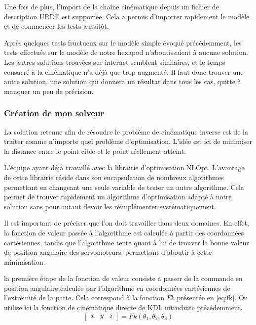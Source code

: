 \documentclass{tnreport}
\begin{document}
Une fois de plus, l'import de la chaîne cinématique depuis un fichier de description URDF est supportée. Cela a permis d'importer rapidement le modèle et de commencer les tests aussitôt.

Après quelques tests fructueux sur le modèle simple évoqué précédemment, les tests effectués sur le modèle de notre hexapod n'aboutissaient à aucune solution. Les autres solutions trouvées sur internet semblent similaires, et le temps consacré à la cinématique n'a déjà que trop augmenté. Il faut donc trouver une autre solution, une solution qui donnera un résultat dans tous les cas, quitte à manquer un peu de précision. 

\subsubsection{Création de mon solveur}
La solution retenue afin de résoudre le problème de cinématique inverse est de la traiter comme n'importe quel problème d'optimisation. L'idée est ici de minimiser la distance entre le point cible et le point réellement atteint. 

L'équipe ayant déjà travaillé avec la librairie d'optimisation NLOpt. L'avantage de cette librairie réside dans son encapsulation de nombreux algorithmes permettant en changeant une seule variable de tester un autre algorithme. Cela permet de trouver rapidement un algorithme d'optimisation adapté à notre solution sans pour autant devoir les réimplémenter systématiquement.

Il est important de préciser que l'on doit travailler dans deux domaines. En effet, la fonction de valeur passée à l'algorithme est calculée à partir des coordonnées cartésiennes, tandis que l'algorithme tente quant à lui de trouver la bonne valeur de position angulaire des servomoteurs, permettant d'aboutir à cette minimisation. 

la première étape de la fonction de valeur consiste à passer de la commande en position angulaire calculée par l'algorithme en coordonnées cartésiennes de l'extrémité de la patte. Cela correspond à la fonction $Fk$ présentée en \ref{eq:fk}. On utilise ici la fonction de cinématique directe de KDL introduite précédemment. 
\begin{equation}\label{eq:fk}
    \begin{bmatrix}
    x & y & z
    \end{bmatrix} = Fk(\theta_1, \theta_2,\theta_3)
\end{equation}
\end{document}
